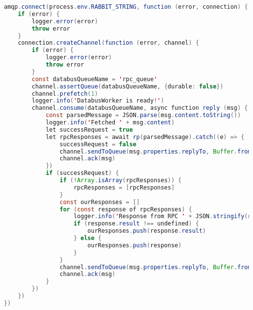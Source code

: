 \begin{lstlisting}[language=java]
amqp.connect(process.env.RABBIT_STRING, function (error, connection) {
	if (error) {
		logger.error(error)
		throw error
	}
	connection.createChannel(function (error, channel) {
		if (error) {
			logger.error(error)
			throw error
		}
		const databusQueueName = 'rpc_queue'
		channel.assertQueue(databusQueueName, {durable: false})
		channel.prefetch(1)
		logger.info('DatabusWorker is ready!')
		channel.consume(databusQueueName, async function reply (msg) {
			const parsedMessage = JSON.parse(msg.content.toString())
			logger.info('Fetched ' + msg.content)
			let successRequest = true
			let rpcResponses = await rp(parsedMessage).catch((e) => {
				successRequest = false
				channel.sendToQueue(msg.properties.replyTo, Buffer.from(JSON.stringify([e])), {correlationId: msg.properties.correlationId})
				channel.ack(msg)
			})
			if (successRequest) {
				if (!Array.isArray(rpcResponses)) {
					rpcResponses = [rpcResponses]
				}
				const ourResponses = []
				for (const response of rpcResponses) {
					logger.info('Response from RPC ' + JSON.stringify(response))
					if (response.result !== undefined) {
						ourResponses.push(response.result)
					} else {
						ourResponses.push(response)
					}
				}
				channel.sendToQueue(msg.properties.replyTo, Buffer.from(JSON.stringify(ourResponses)), {correlationId: msg.properties.correlationId})
				channel.ack(msg)
			}
		})
	})
})
\end{lstlisting}


